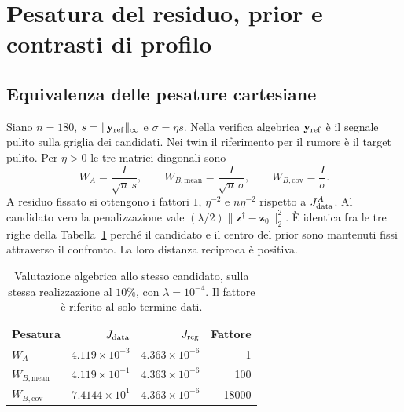\section{Pesatura del residuo, prior e contrasti di profilo}
\label{app:objective}
\setcounter{figure}{0}\setcounter{table}{0}\setcounter{equation}{0}

\subsection{Equivalenza delle pesature cartesiane}
Siano $n=180$, $s=\|\mathbf y_{\rm ref}\|_\infty$ e $\sigma=\eta s$. Nella verifica algebrica $\mathbf y_{\rm ref}$ è il segnale pulito sulla griglia dei candidati. Nei twin il riferimento per il rumore è il target pulito. Per $\eta>0$ le tre matrici diagonali sono
\[
 W_A=\frac{I}{\sqrt n\,s},\qquad
 W_{B,\mathrm{mean}}=\frac{I}{\sqrt n\,\sigma},\qquad
 W_{B,\mathrm{cov}}=\frac{I}{\sigma}.
\]
A residuo fissato si ottengono i fattori $1$, $\eta^{-2}$ e $n\eta^{-2}$ rispetto a $J_{\rm data}^{A}$. Al candidato vero la penalizzazione vale $(\lambda/2)\|\mathbf z^\dagger-\mathbf z_0\|_2^2$. È identica fra le tre righe della Tabella~\ref{tab:app-weight-modes} perché il candidato e il centro del prior sono mantenuti fissi attraverso il confronto. La loro distanza reciproca è positiva.

\begin{table}[!htbp]\centering\small
\caption{Valutazione algebrica allo stesso candidato, sulla stessa realizzazione al $10\%$, con $\lambda=10^{-4}$. Il fattore è riferito al solo termine dati.}
\label{tab:app-weight-modes}
\begin{tabular}{@{}lrrr@{}}\toprule
Pesatura & $J_{\rm data}$ & $J_{\rm reg}$ & Fattore\\\midrule
$W_A$ & $4.119\times10^{-3}$ & $4.363\times10^{-6}$ & 1\\
$W_{B,\mathrm{mean}}$ & $4.119\times10^{-1}$ & $4.363\times10^{-6}$ & 100\\
$W_{B,\mathrm{cov}}$ & $7.4144\times10^1$ & $4.363\times10^{-6}$ & 18000\\\bottomrule
\end{tabular}
\end{table}

